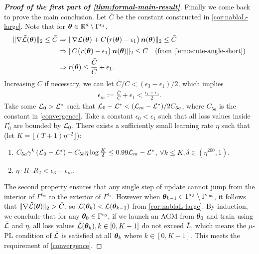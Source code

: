 \begin{proof}[\textbf{Proof of the first part of \cref{thm:formal-main-result}}]
Finally we come back to prove the main conclusion. Let $\bar{C}$ be the constant constructed in \cref{cor:nablaL-large}. Note that for ${\bm{\theta}} \in \mathbb{R}^d \setminus \Gamma^{\epsilon_1}$, \begin{align*}
    \normtwo{\nabla\tilde{\cL}(\vtheta)} \leq \bar{C} &\Rightarrow \normtwo{\nabla \cL(\vtheta) + C\big(r(\vtheta)-\epsilon_1\big)\,\vn(\vtheta)} \leq \bar{C} \\
     &\Rightarrow \normtwo{C\big(r(\vtheta)-\epsilon_1\big)\,\vn(\vtheta)} \leq \bar{C} \quad \text{(from \cref{lem:acute-angle-short})}\\
    &\Rightarrow r(\vtheta) \leq \frac{\bar{C}}{C} + \epsilon_1. 
\end{align*}
Increasing $C$ if necessary, we can let $\bar{C} / C < (\epsilon_3 - \epsilon_1) / 2$, which implies \begin{align*}
    \epsilon_{m} :=  \frac{\bar{C}}{C} + \epsilon_1 < \frac{\epsilon_1 + \epsilon_3}{2}.
\end{align*} Take some $\mathcal{L}_0 > \mathcal{L}^*$ such that $\mathcal{L}_0 - \mathcal{L}^* < (\mathcal{L}_m - \mathcal{L}^*) / 2C_{5a}$, where $C_{5a}$ is the constant in \cref{convergence}. Take a constant $\epsilon_0 < \epsilon_1$ such that all loss values inside $\Gamma^\epsilon_0$ are bounded by $\mathcal{L}_0$. There exists a sufficiently small learning rate $\eta$ such that (let $K=\lfloor (T+1)\eta^{-2}\rfloor$):
\begin{enumerate}
    \item $C_{5a}\gamma^k \left(\mathcal{L}_0 - \mathcal{L}^*\right) + C_{5b}\eta\log \frac{K}{\delta} \leq 0.99\mathcal{L}_m - \mathcal{L}^*$, $\forall k \leq K, \delta \in (\eta^{200}, 1)$. 
    \item $\eta \cdot R \cdot R_2 < \epsilon_3 - \epsilon_{m}$.
\end{enumerate}
The second property ensures that any single step of update cannot jump from the interior of $\Gamma^{\epsilon_m}$ to the exterior of $\Gamma^{\epsilon_3}$. However when ${\bm{\theta}}_{k-1} \in \Gamma^{\epsilon_3} \setminus \Gamma^{\epsilon_m}$, it follows that $\|\nabla\tilde{\mathcal{L}}({\bm{\theta}})\|_2 > \bar{C}$, so $\mathcal{L}({\bm{\theta}}_k) < \mathcal{L}({\bm{\theta}}_{k-1})$ from \cref{cor:nablaL-large}. By induction, we conclude that for any ${\bm{\theta}}_0 \in \Gamma^{\epsilon_0}$, if we launch an AGM from ${\bm{\theta}}_0$ and train using $\tilde{\mathcal{L}}$ and $\eta$, all loss values $\tilde{\mathcal{L}}({\bm{\theta}}_k), k \in [0, K-1]$ do not exceed $\bar{L}$, which means the $\mu$-PL condition of $\tilde{\mathcal{L}}$ is satisfied at all ${\bm{\theta}}_k$ where $k \in [0, K-1]$. This meets the requirement of \cref{convergence}.


\end{proof}
